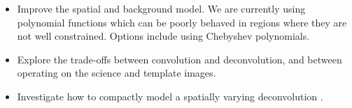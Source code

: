 \begin{itemize}
\item Improve the spatial  and background model. We 
   are currently using polynomial functions which can be poorly
   behaved in regions where they are not well constrained.  Options
   include using Chebyshev polynomials.

\item Explore the trade-offs between convolution 
   and deconvolution, and between operating on the science and
   template images.

\item Investigate how to compactly model a spatially varying 
   deconvolution .

\end{itemize}
